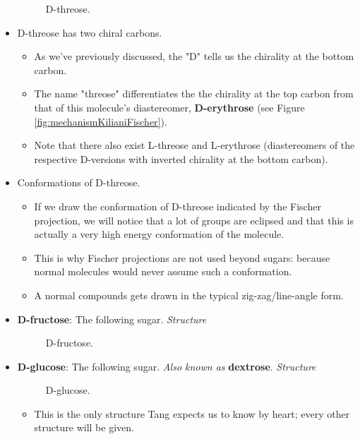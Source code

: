 \documentclass[../notes.tex]{subfiles}
\begin{document}
\begin{itemize}
\begin{figure}[h!]
        \caption{D-threose.}
        \label{fig:dThreose}
    \end{figure}
    \item D-threose has two chiral carbons.
    \begin{itemize}
        \item As we've previously discussed, the "D" tells us the chirality at the bottom carbon.
        \item The name "threose" differentiates the the chirality at the top carbon from that of this molecule's diastereomer, \textbf{D-erythrose} (see Figure \ref{fig:mechanismKilianiFischer}).
        \item Note that there also exist L-threose and L-erythrose (diastereomers of the respective D-versions with inverted chirality at the bottom carbon).
    \end{itemize}
    \item Conformations of D-threose.
    \begin{itemize}
        \item If we draw the conformation of D-threose indicated by the Fischer projection, we will notice that a lot of groups are eclipsed and that this is actually a very high energy conformation of the molecule.
        \item This is why Fischer projections are not used beyond sugars: because normal molecules would never assume such a conformation.
        \item A normal compounds gets drawn in the typical zig-zag/line-angle form.
    \end{itemize}
    \item \textbf{D-fructose}: The following sugar. \emph{Structure}
    \begin{figure}[H]
        \centering
        \footnotesize
        \caption{D-fructose.}
        \label{fig:dFructose}
    \end{figure}
    \item \textbf{D-glucose}: The following sugar. \emph{Also known as} \textbf{dextrose}. \emph{Structure}
    \begin{figure}[h!]
        \centering
        \footnotesize
        \caption{D-glucose.}
        \label{fig:dGlucose}
    \end{figure}
    \begin{itemize}
        \item This is the only structure Tang expects us to know by heart; every other structure will be given.

\end{itemize}
\end{itemize}
\end{document}

